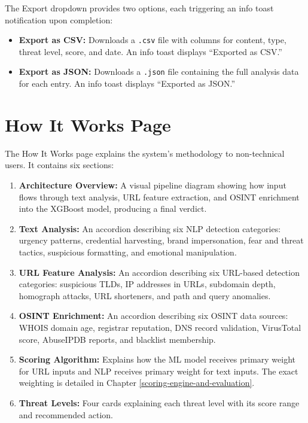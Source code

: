The Export dropdown provides two options, each triggering an info toast notification upon completion:
\begin{itemize}
\item \textbf{Export as CSV:} Downloads a \texttt{.csv} file with columns for content, type, threat level, score, and date. An info toast displays ``Exported as CSV.''
\item \textbf{Export as JSON:} Downloads a \texttt{.json} file containing the full analysis data for each entry. An info toast displays ``Exported as JSON.''
\end{itemize}

\section{How It Works Page}

The How It Works page explains the system's methodology to non-technical users. It contains six sections:

\begin{enumerate}
\item \textbf{Architecture Overview:} A visual pipeline diagram showing how input flows through text analysis, URL feature extraction, and OSINT enrichment into the XGBoost model, producing a final verdict.
\item \textbf{Text Analysis:} An accordion describing six NLP detection categories: urgency patterns, credential harvesting, brand impersonation, fear and threat tactics, suspicious formatting, and emotional manipulation.
\item \textbf{URL Feature Analysis:} An accordion describing six URL-based detection categories: suspicious TLDs, IP addresses in URLs, subdomain depth, homograph attacks, URL shorteners, and path and query anomalies.
\item \textbf{OSINT Enrichment:} An accordion describing six OSINT data sources: WHOIS domain age, registrar reputation, DNS record validation, VirusTotal score, AbuseIPDB reports, and blacklist membership.
\item \textbf{Scoring Algorithm:} Explains how the ML model receives primary weight for URL inputs and NLP receives primary weight for text inputs. The exact weighting is detailed in Chapter \ref{scoring-engine-and-evaluation}.
\item \textbf{Threat Levels:} Four cards explaining each threat level with its score range and recommended action.
\end{enumerate}

